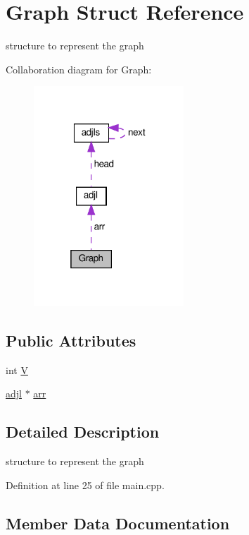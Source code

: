 \hypertarget{struct_graph}{}\section{Graph Struct Reference}
\label{struct_graph}


structure to represent the graph  




Collaboration diagram for Graph\+:
\nopagebreak
\begin{figure}[H]
\begin{center}
\leavevmode
\includegraphics[width=160pt]{struct_graph__coll__graph}
\end{center}
\end{figure}
\subsection*{Public Attributes}
\begin{DoxyCompactItemize}
\item 
int \hyperlink{struct_graph_a2b722f7cfa7a21e4cb5fae488b3d4dcc}{V}
\item 
\hyperlink{structadjl}{adjl} $\ast$ \hyperlink{struct_graph_ab5c1ddc06af0bc6312dd1af78885ca4f}{arr}
\end{DoxyCompactItemize}


\subsection{Detailed Description}
structure to represent the graph 

Definition at line 25 of file main.\+cpp.



\subsection{Member Data Documentation}
\mbox{\label{struct_graph_ab5c1ddc06af0bc6312dd1af78885ca4f}} 
